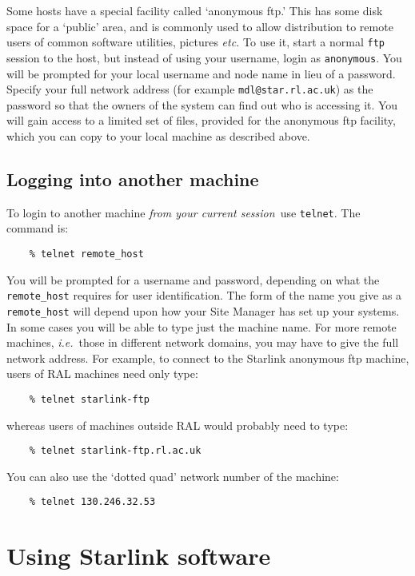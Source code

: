 Some hosts have a special facility called `anonymous ftp.'
This has some disk space for a `public' area, and is commonly used to
allow distribution to remote users of common software utilities, pictures
{\em etc.}
To use it, start a normal {\tt ftp} session to the host, but instead of using
your username, login as {\tt anonymous}.
You will be prompted for your local username and node name in lieu of a
password. 
Specify your full network address (for example \verb+mdl@star.rl.ac.uk+) as the
password so that the owners of the system can find out who is accessing it.
You will gain access to a limited set of files, provided for the anonymous ftp
facility, which you can copy to your local machine as described above. 

\subsection{Logging into another machine}

To login to another machine {\em from your current session}\, use {\tt telnet}.
The command is:
\begin{verbatim}
    % telnet remote_host
\end{verbatim}
You will be prompted for a username and password, depending on what the
{\tt remote\_host} requires for user identification.
The form of the name you give as a {\tt remote\_host}
will depend upon how your Site Manager has set up your systems.
In some cases you will be able to type just the machine name.
For more remote machines, {\em i.e.}\, those in different network domains, you
may have to give the full network address.
For example, to connect to the Starlink anonymous ftp machine, users of RAL
machines need only type:
\begin{verbatim}
    % telnet starlink-ftp
\end{verbatim}
whereas users of machines outside RAL would probably need to type:
\begin{verbatim}
    % telnet starlink-ftp.rl.ac.uk
\end{verbatim}
You can also use the `dotted quad' network number of the machine:
\begin{verbatim}
    % telnet 130.246.32.53
\end{verbatim}

\section{Using Starlink software}
\label{USSC}


